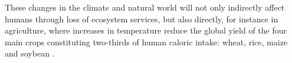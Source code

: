 
These changes in the climate and natural world will not only indirectly affect humans through loss of ecosystem services, but also directly, for instance in agriculture, where increases in temperature reduce the global yield of the four main crops constituting two-thirds of human caloric intake: wheat, rice, maize and soybean \cite{Zhao2017}.


